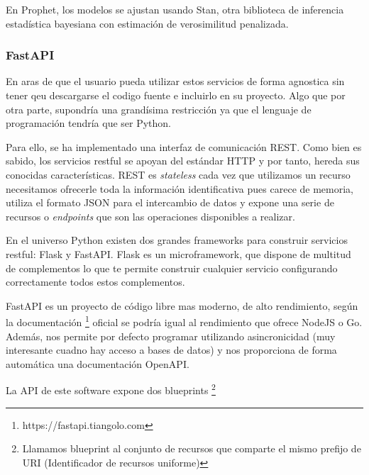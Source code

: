 En Prophet, los modelos se ajustan usando Stan, otra biblioteca de inferencia estadística bayesiana con estimación de verosimilitud penalizada.

\subsubsection{FastAPI}
En aras de que el usuario pueda utilizar estos servicios de forma agnostica sin tener qeu descargarse el codigo fuente e incluirlo en su proyecto. Algo que por otra parte, supondría una grandísima restricción ya que el lenguaje de programación tendría que ser Python.

Para ello, se ha implementado una interfaz de comunicación REST. Como bien es sabido, los servicios restful se apoyan del estándar HTTP y por tanto, hereda sus conocidas características. REST es \textit{stateless} cada vez que utilizamos un recurso necesitamos ofrecerle toda la información identificativa pues carece de memoria, utiliza el formato JSON para el intercambio de datos y expone una serie de recursos o \textit{endpoints} que son las operaciones disponibles a realizar.

En el universo Python existen dos grandes frameworks para construir servicios restful: Flask y FastAPI.
Flask es un microframework, que dispone de multitud de complementos lo que te permite construir cualquier servicio configurando correctamente todos estos complementos. 

FastAPI es un proyecto de código libre mas moderno, de alto rendimiento, según la documentación \footnote{https://fastapi.tiangolo.com} oficial se podría igual al rendimiento que ofrece NodeJS o Go. Además, nos permite por defecto programar utilizando asincronicidad (muy interesante cuadno hay acceso a bases de datos) y nos proporciona de forma automática una documentación OpenAPI.

La API de este software expone dos blueprints \footnote{Llamamos blueprint al conjunto de recursos que comparte el mismo prefijo de URI (Identificador de recursos uniforme)}

